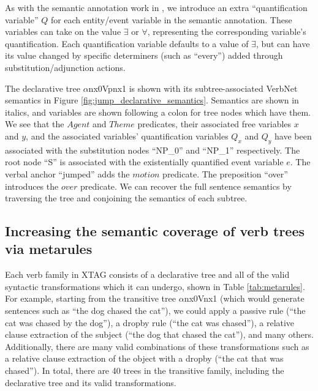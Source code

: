 \documentclass[11pt,a4paper]{article}
\begin{document}
As with the semantic annotation work in \cite{sayeed2012incremental}, we introduce an extra ``quantification variable'' $Q$ for each entity/event variable in the semantic annotation. These variables can take on the value $\exists$ or $\forall$, representing the corresponding variable's quantification. Each quantification variable defaults to a value of $\exists$, but can have its value changed by specific determiners (such as ``every'') added through substitution/adjunction actions.

The declarative tree $\alpha$nx0Vpnx1 is shown with its subtree-associated VerbNet semantics in Figure \ref{fig:jump_declarative_semantics}. Semantics are shown in italics, and variables are shown following a colon for tree nodes which have them. We see that the $Agent$ and $Theme$ predicates, their associated free variables $x$ and $y$, and the associated variables' quantification variables $Q_x$ and $Q_y$ have been associated with the substitution nodes ``NP\_0'' and ``NP\_1'' respectively. The root node ``S'' is associated with the existentially quantified event variable $e$. The verbal anchor ``jumped'' adds the $motion$ predicate. The preposition ``over'' introduces the $over$ predicate. We can recover the full sentence semantics by traversing the tree and conjoining the semantics of each subtree.

\subsection{Increasing the semantic coverage of verb trees via metarules}

Each verb family in XTAG consists of a declarative tree and all of the valid syntactic transformations which it can undergo, shown in Table \ref{tab:metarules}. For example, starting from the transitive tree $\alpha$nx0Vnx1 (which would generate sentences such as ``the dog chased the cat''), we could apply a passive rule (``the cat was chased by the dog''), a dropby rule (``the cat was chased''), a relative clause extraction of the subject (``the dog that chased the cat''), and many others. Additionally, there are many valid combinations of these transformations such as a relative clause extraction of the object with a dropby (``the cat that was chased''). In total, there are 40 trees in the transitive family, including the declarative tree and its valid transformations.
\end{document}
